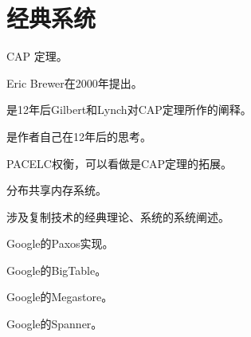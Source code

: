 \chapter{经典系统}

\begin{theorem}
    
    CAP 定理。
    
    Eric Brewer在2000年提出。
    
    \emph{\cite{Gilbert12}}是12年后Gilbert和Lynch对CAP定理所作的阐释。
    
    \emph{\cite{Brewer12}}是作者自己在12年后的思考。
    
\end{theorem}

\begin{theorem}
    
    PACELC权衡，可以看做是CAP定理的拓展。
    
\end{theorem}

\begin{theorem}[\cite{Li89}]
    
    分布共享内存系统。
    
\end{theorem}

\begin{theorem}
    
    涉及复制技术的经典理论、系统的系统阐述。
    
\end{theorem}

\begin{theorem}
    
    Google的Paxos实现。
    
\end{theorem}

\begin{theorem}
    
    Google的BigTable。
    
\end{theorem}

\begin{theorem}
    
    Google的Megastore。
    
\end{theorem}

\begin{theorem}
    
    Google的Spanner。
    
\end{theorem}

